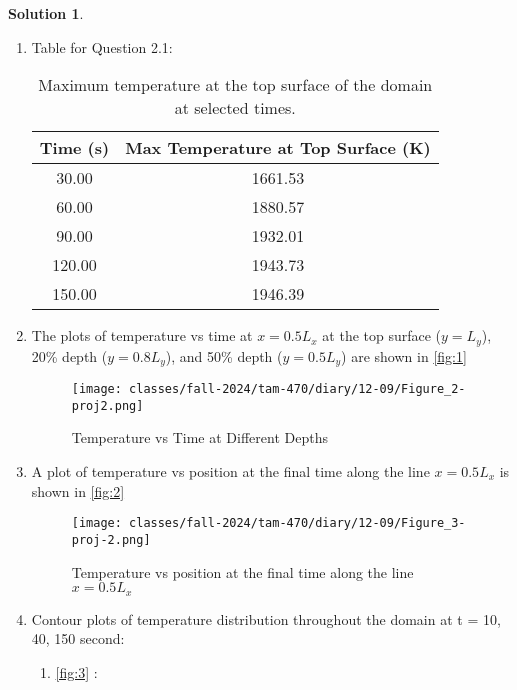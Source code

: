 \documentclass[12pt]{article}
\theoremstyle{definition} %
\newtheorem{solution}{Solution}
\theoremstyle{plain} %
\begin{document}
\begin{solution}
\begin{enumerate}
        \item Table for Question 2.1: \begin{table}[h!]
            \centering
            \begin{tabular}{|c|c|}
                \hline
                Time (s) & Max Temperature at Top Surface (K) \\ \hline
                30.00 & 1661.53 \\ \hline
                60.00 & 1880.57 \\ \hline
                90.00 & 1932.01 \\ \hline
                120.00 & 1943.73 \\ \hline
                150.00 & 1946.39 \\ \hline
            \end{tabular}
            \caption{Maximum temperature at the top surface of the domain at selected times.}
            \label{tab:maxtemp}
        \end{table}
    \item The plots of temperature vs time at $x = 0.5L_x$ at the top surface ($y = L_y$), 20\% depth ($y = 0.8L_y$), and 50\% depth ($y = 0.5L_y$) are shown in \autoref{fig:1}
     \begin{figure}[htbp]
        \centering
        \texttt{[image: classes/fall-2024/tam-470/diary/12-09/Figure\_2-proj2.png]}
        \caption{Temperature vs Time at Different Depths}
        \label{fig:1}
    \end{figure}
    \item A plot of temperature vs position at the final time along the line $x = 0.5L_x$ is shown in \autoref{fig:2}
     \begin{figure}[htbp]
        \centering
        \texttt{[image: classes/fall-2024/tam-470/diary/12-09/Figure\_3-proj-2.png]}
        \caption{Temperature vs position at the final time along the line $x = 0.5L_x$}
        \label{fig:2}
    \end{figure}
    \item Contour plots of temperature distribution throughout the domain at t = 10, 40, 150
    second:
    \begin{enumerate}
        \item \autoref{fig:3} : \begin{figure}[htbp]


\end{figure}
\end{enumerate}
\end{enumerate}
\end{solution}
\end{document}
